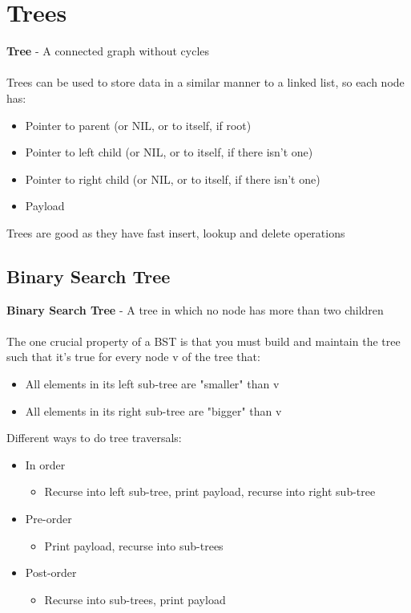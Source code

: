 \documentclass{article}[18pt]
\begin{document}
\section{Trees}
\textbf{Tree} - A connected graph without cycles\\
\\
Trees can be used to store data in a similar manner to a linked list, so each node has:
\begin{itemize}
	\item Pointer to parent (or NIL, or to itself, if root)
	\item Pointer to left child (or NIL, or to itself, if there isn't one)
	\item Pointer to right child (or NIL, or to itself, if there isn't one)
	\item Payload
\end{itemize}
Trees are good as they have fast insert, lookup and delete operations
\subsection{Binary Search Tree}
\textbf{Binary Search Tree} - A tree in which no node has more than two children\\
\\
The one crucial property of a BST is that you must build and maintain the tree such that it's true for every node v of the tree that:
\begin{itemize}
	\item All elements in its left sub-tree are "smaller" than v
	\item All elements in its right sub-tree are "bigger" than v
\end{itemize}
Different ways to do tree traversals:
\begin{itemize}
	\item In order
	\begin{itemize}
		\item Recurse into left sub-tree, print payload, recurse into right sub-tree	
	\end{itemize}
	\item Pre-order
	\begin{itemize}
		\item Print payload, recurse into sub-trees
	\end{itemize}
	\item Post-order
	\begin{itemize}
		\item Recurse into sub-trees, print payload 			
	\end{itemize}
\end{itemize}
\end{document}
